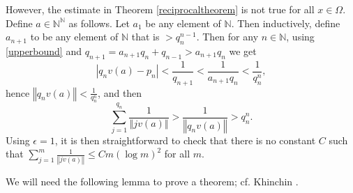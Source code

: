\documentclass{article}
\newcommand{\norm}[1]{\left\Vert #1 \right\Vert}
\begin{document}
However, the estimate in Theorem \ref{reciprocaltheorem} is not true for all $x \in \Omega$.
Define $a \in \mathbb{N}^\mathbb{N}$ as follows. Let $a_1$ be any element of $\mathbb{N}$. Then inductively, define
$a_{n+1}$ to be any element of $\mathbb{N}$ that is $>q_n^{n-1}$. Then for any $n \in \mathbb{N}$,  using \eqref{upperbound} and
$q_{n+1}=a_{n+1}q_n+q_{n-1}>a_{n+1}q_n$ we get
\[
| q_n v(a) - p_n| < \frac{1}{q_{n+1}} <\frac{1}{a_{n+1}q_n}<\frac{1}{q_n^n},
\] 
hence $\norm{q_n v(a)} < \frac{1}{q_n^n}$, and then
\[
\sum_{j=1}^{q_n} \frac{1}{\norm{j v(a)}} > \frac{1}{\norm{q_n v(a)}} > q_n^n.
\]
Using $\epsilon=1$, it is then straightforward to check that there is no constant $C$ such that $\sum_{j=1}^m \frac{1}{\norm{jv(a)}} \leq 
C m(\log m)^2$ for all $m$. 

We will need the following lemma  \cite[p.~324, Lemma 3]{billingsley}  to prove a theorem;
cf. Khinchin \cite[p. 63, Theorem 30]{MR1451873}. 
\end{document}
